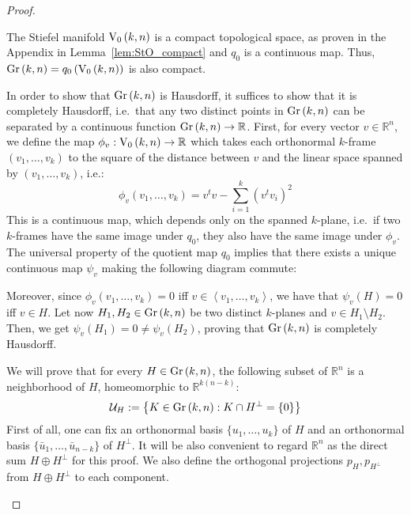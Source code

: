 \begin{proof} \begin{b_item}
\item The Stiefel manifold $\StO{k}{n}$ is a compact topological space, as proven in the Appendix in Lemma~\ref{lem:StO_compact} and $q_0$ is a continuous map. Thus, $\Gr{k}{n}=q_0\left(\StO{k}{n}\right)$ is also compact.
\item In order to show that $\Gr{k}{n}$ is Hausdorff, it suffices to show that it is completely Hausdorff, i.e.\ that any two distinct points in $\Gr{k}{n}$ can be separated by a continuous function $\Gr{k}{n}\to\mathbb{R}$. First, for every vector $v\in\mathbb{R}^n$, we define the map $\phi_v:\StO{k}{n}\to\mathbb{R}$ which takes each orthonormal $k$-frame $(v_1,\ldots,v_k)$ to the square of the distance between $v$ and the linear space spanned by $(v_1,\ldots,v_k)$, i.e.:
\[\phi_v(v_1,\ldots,v_k)=v^tv-\sum_{i=1}^k{\left(v^tv_i\right)}^2\]
This is a continuous map, which depends only on the spanned $k$-plane, i.e.\ if two $k$-frames have the same image under $q_0$, they also have the same image under $\phi_v$. The universal property of the quotient map $q_0$ implies that there exists a unique continuous map $\psi_v$ making the following diagram commute:

\begin{center}
\end{center}

Moreover, since $\phi_v(v_1,\ldots,v_k)=0$ iff $v\in\left<v_1,\ldots,v_k\right>$, we have that $\psi_v(H)=0$ iff $v\in H$. Let now $H_1,H_2\in\Gr{k}{n}$ be two distinct $k$-planes and $v\in H_1\setminus H_2$. Then, we get $\psi_v(H_1)=0\neq\psi_v(H_2)$, proving that $\Gr{k}{n}$ is completely Hausdorff.


\item We will prove that for every $H\in\Gr{k}{n}$, the following subset of $\mathbb{R}^n$ is a neighborhood of $H$, homeomorphic to $\mathbb{R}^{k(n-k)}$:
\[\mathcal{U}_H:=\left\{K\in\Gr{k}{n}:K\cap H^{\perp}=\{0\}\right\}\]
First of all, one can fix an orthonormal basis $\{u_1,\ldots,u_k\}$ of $H$ and an orthonormal basis $\{\bar{u}_1,\ldots,\bar{u}_{n-k}\}$ of $H^{\perp}$. It will be also convenient to regard $\mathbb{R}^n$ as the direct sum $H\oplus H^{\perp}$ for this proof. We also define the orthogonal projections $p_H,p_{H^{\perp}}$ from $H\oplus H^{\perp}$ to each component.


\end{b_item}
\end{proof}
